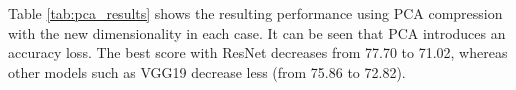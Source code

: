 \documentclass[final, twocolumn]{elsarticle}
\begin{document}


Table \ref{tab:pca_results} shows the resulting performance using PCA compression with the new dimensionality in each case. It can be seen that PCA introduces an accuracy loss. The best score with ResNet decreases from 77.70 to 71.02, whereas other models such as VGG19 decrease less (from 75.86 to 72.82).  %
\end{document}
